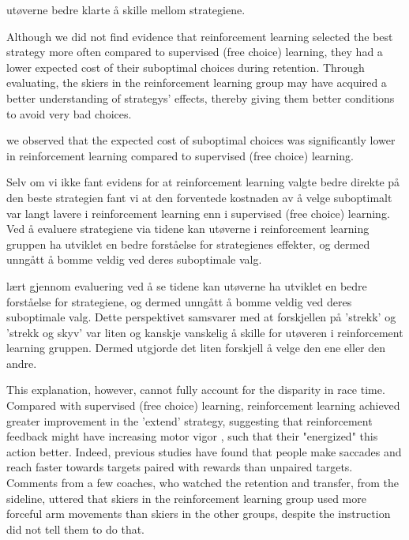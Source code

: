 utøverne bedre klarte å skille mellom strategiene. 



Although we did not find evidence that reinforcement learning selected the best strategy more often compared to supervised (free choice) learning, they had a lower expected cost of their suboptimal choices during retention. Through evaluating,  the skiers in the reinforcement learning group may have acquired a better understanding of strategys' effects, thereby giving them better conditions to avoid very bad choices.


we observed that the expected cost of suboptimal choices was significantly lower in reinforcement learning compared to supervised (free choice) learning. 

 


Selv om vi ikke fant evidens for at reinforcement learning valgte bedre direkte på den beste strategien fant vi at den forventede kostnaden av å velge suboptimalt var langt lavere i reinforcement learning enn i supervised (free choice) learning. Ved å evaluere strategiene via tidene kan utøverne i reinforcement learning gruppen ha utviklet en bedre forståelse for strategienes effekter, og dermed unngått å bomme veldig ved deres suboptimale valg. 


lært gjennom evaluering ved å se tidene kan utøverne ha utviklet en bedre forståelse for strategiene, og dermed unngått å bomme veldig ved deres suboptimale valg. Dette perspektivet samsvarer med at forskjellen på 'strekk' og 'strekk og skyv' var liten og kanskje vanskelig å skille for utøveren i reinforcement learning gruppen. Dermed utgjorde det liten forskjell å velge den ene eller den andre. 

This explanation, however, cannot fully account for the disparity in race time. Compared with supervised (free choice) learning, reinforcement learning achieved greater improvement in the 'extend' strategy, suggesting that reinforcement feedback might have increasing motor vigor \cite{pietro_mazzoni_why_2007, dudman_basal_2016}, such that their "energized" this action better. Indeed, previous studies have found that people make saccades \cite{takikawa_modulation_2002} and reach\cite{summerside_vigor_2018} faster towards targets paired with rewards than unpaired targets. Comments from a few coaches, who watched the retention and transfer, from the sideline, uttered that skiers in the reinforcement learning group used more forceful arm movements than skiers in the other groups, despite the instruction did not tell them to do that.





